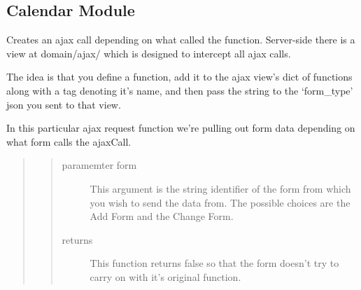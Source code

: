 \documentclass[letterpaper,10pt,english]{sphinxmanual}
\begin{document}
\subsection{Calendar Module}
\label{javascript-files:calendar-module}

\begin{fulllineitems}
\label{javascript-files:ajaxCall}
\end{fulllineitems}


Creates an ajax call depending on what called the function. Server-side there
is a view at domain/ajax/ which is designed to intercept all ajax calls.

The idea is that you define a function, add it to the ajax view's dict of
functions along with a tag denoting it's name, and then pass the string to
the `form\_type' json you sent to that view.

In this particular ajax request function we're pulling out form data
depending on what form calls the ajaxCall.
\begin{quote}
\begin{quote}\begin{description}
\item[{paramemter form}] \leavevmode
This argument is the string identifier of the form from
which you wish to send the data from. The possible
choices are the Add Form and the Change Form.

\item[{returns}] \leavevmode
This function returns false so that the form doesn't try to
carry on with it's original function.

\end{description}\end{quote}
\end{quote}

\begin{fulllineitems}
\label{javascript-files:onOptionChange}
\end{fulllineitems}
\end{document}
